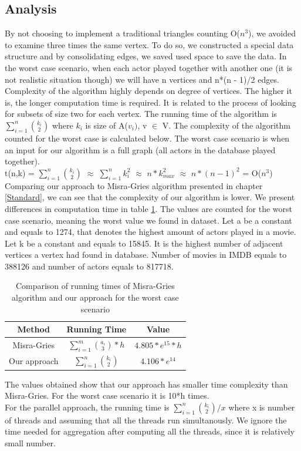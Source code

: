 \subsection{Analysis}
By not choosing to implement a traditional triangles counting O(\(n^3\)), we avoided to examine three times the same vertex. To do so, we constructed a special data structure and by consolidating edges, we saved used space to save the data.
In the worst case scenario, when each actor played together with another one (it is not realistic situation though) we will have n vertices and n*(n - 1)/2 edges.
\\
Complexity of the algorithm highly depends on degree of vertices. The higher it is, the longer computation time is required. It is related to the process of looking for subsets of size two for each vertex. The running time of the algorithm is \(\sum\limits_{i=1}^n{k_i \choose 2}\) where \(k_i\) is size of A(\(v_i)\), v \(\in\) V. The complexity of the algorithm counted for the worst case is calculated below. The worst case scenario is when an input for our algorithm is a full graph (all actors in the database played together).
\\
t(n,k) = \(\sum\limits_{i=1}^n{k_i \choose 2}\) \(\approx\) \(\sum\limits_{i=1}^n{k_i^2}\) \(\approx\) \(n*k_{max}^2\) \(\approx\) \(n*(n-1)^2\) = O(\(n^3\))
\\
Comparing our approach to Misra-Gries algorithm presented in chapter \ref{Standard}, we can see that the complexity of our algorithm is lower. We present differences in computation time in table \ref{comparison}. The values are counted for the worst case scenario, meaning the worst value we found in dataset. Let a be a constant and equals to 1274, that denotes the highest amount of actors played in a movie. Let k be a constant and equals to 15845. It is the highest number of adjacent vertices a vertex had found in database. Number of movies in IMDB equals to 388126 and number of actors equals to 817718. 
\begin{table}[ht]
\caption{Comparison of running times of Misra-Gries algorithm and our approach for the worst case scenario}
\centering
\begin{tabular}{c c c}
\hline\hline
Method & Running Time & Value \\ [0.5ex]
\hline
Misra-Gries&\(\sum\limits_{i=1}^m{a_i \choose 3}*h\)&\(4.805*e^{15} * h\)\\
Our approach&\(\sum\limits_{i=1}^n{k_i \choose 2}\)&\(4.106*e^{14}\)\\
\hline
\end{tabular}
\label{comparison}
\end{table}
The values obtained show that our approach has smaller time complexity than Misra-Gries. For the worst case scenario it is 10*h times.
\\
For the parallel approach, the running time is \(\sum\limits_{i=1}^n{k_i \choose 2}/x\) where x is number of threads and assuming that all the threads run simultanously. We ignore the time needed for aggregation after computing all the threads, since it is relatively small number.
